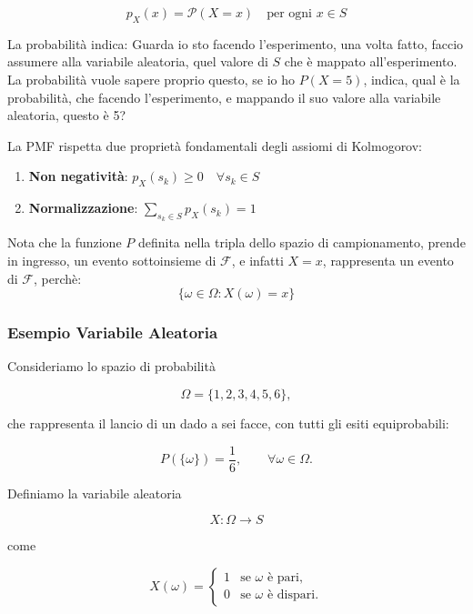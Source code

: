 \[
p_X(x) = \mathcal{P}(X = x) \quad \text{per ogni } x \in S
\]

\begin{observation}
La probabilità indica:
Guarda io sto facendo l'esperimento, una volta fatto, faccio assumere alla variabile aleatoria, quel valore di $S$ che è mappato all'esperimento.
La probabilità vuole sapere proprio questo, se io ho $P(X = 5)$, indica, qual è la probabilità, che facendo l'esperimento, e mappando il suo valore alla variabile aleatoria, questo è 5?
\end{observation}

La PMF rispetta due proprietà fondamentali degli assiomi di Kolmogorov:
\begin{enumerate}
    \item \textbf{Non negatività}: $p_X(s_k) \ge 0 \quad \forall s_k \in S$
    \item \textbf{Normalizzazione}: $\sum_{s_k \in S} p_X(s_k) = 1$
\end{enumerate}


\begin{warning}
    Nota che la funzione $P$ definita nella tripla dello spazio di campionamento, prende in ingresso, un evento sottoinsieme di $\mathcal{F}$,
    e infatti $X=x$, rappresenta un evento di $\mathcal{F}$, perchè:
    \begin{equation}
        \{\omega \in \Omega : X(\omega) = x\}
    \end{equation}
\end{warning}

\subsubsection{Esempio Variabile Aleatoria}

Consideriamo lo spazio di probabilità

\[
\Omega = \{1,2,3,4,5,6\},
\]

che rappresenta il lancio di un dado a sei facce, con tutti gli esiti equiprobabili:

\[
P(\{\omega\}) = \frac{1}{6},
\qquad \forall \omega \in \Omega.
\]

Definiamo la variabile aleatoria

\[
X:\Omega \to S
\]

come

\[
X(\omega)=
\begin{cases}
1 & \text{se } \omega \text{ è pari},\\
0 & \text{se } \omega \text{ è dispari}.
\end{cases}
\]

